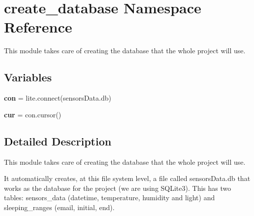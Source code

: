 \hypertarget{namespacecreate__database}{}\section{create\+\_\+database Namespace Reference}
\label{namespacecreate__database}


This module takes care of creating the database that the whole project will use.  


\subsection*{Variables}
\begin{DoxyCompactItemize}
\item 
\mbox{\label{namespacecreate__database_afbd3d7c13ac3ee3fceefdd1e50856485}} 
{\bfseries con} = lite.\+connect(\textquotesingle{}sensors\+Data.\+db\textquotesingle{})
\item 
\mbox{\label{namespacecreate__database_a6d16d5f7424ea858d0e119e66ddfed31}} 
{\bfseries cur} = con.\+cursor()
\end{DoxyCompactItemize}


\subsection{Detailed Description}
This module takes care of creating the database that the whole project will use. 

It automatically creates, at this file system level, a file called \textquotesingle{}sensors\+Data.\+db\textquotesingle{} that works as the database for the project (we are using S\+Q\+Lite3). This has two tables\+: sensors\+\_\+data (datetime, temperature, humidity and light) and sleeping\+\_\+ranges (email, initial, end). 